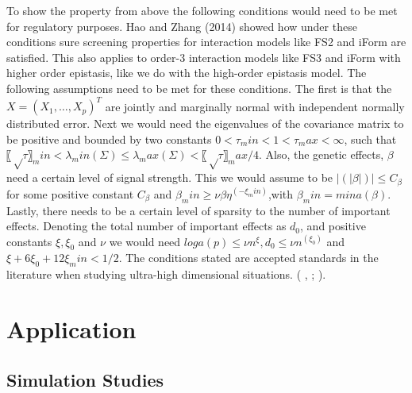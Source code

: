 \documentclass[]{book}
\theoremstyle{definition}
\theoremstyle{definition}
\theoremstyle{remark}
\begin{document}
To show the property from above the following conditions would need to
be met for regulatory purposes. Hao and Zhang (2014) showed how under
these conditions sure screening properties for interaction models like
FS2 and iForm are satisfied. This also applies to order-3 interaction
models like FS3 and iForm with higher order epistasis, like we do with
the high-order epistasis model. The following assumptions need to be met
for these conditions. The first is that the \(X=(X_1,…,X_p )^T\) are
jointly and marginally normal with independent normally distributed
error. Next we would need the eigenvalues of the covariance matrix to be
positive and bounded by two constants \(0<τ_min<1<τ_max<∞\), such that
\(〖√τ〗_min<λ_min (Σ)≤λ_max (Σ)<〖√τ〗_max/4\). Also, the genetic
effects, \(β\) need a certain level of signal strength. This we would
assume to be \(|(|β|)|≤C_β\) for some positive constant \(C_β\) and
\(β_min≥νβη^(-ξ_min )\),with \(β_min=mina(β)\). Lastly, there needs to
be a certain level of sparsity to the number of important effects.
Denoting the total number of important effects as \(d_0\), and positive
constants \(ξ,ξ_0\) and \(ν\) we would need
\(loga(p)≤νn^ξ,d_0≤νn^(ξ_0 )\) and \(ξ+6ξ_0+12ξ_min<1/2\). The
conditions stated are accepted standards in the literature when studying
ultra-high dimensional situations. (\cite{hao2014interaction} ,
\cite{fan2008sure}; \cite{sun2013genome}).

\section{Application}\label{application-1}

\subsection{Simulation Studies}\label{simulation-studies}
\end{document}
